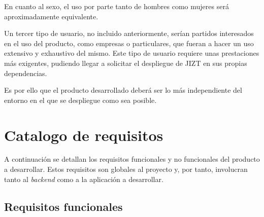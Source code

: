 En cuanto al sexo, el uso por parte tanto de hombres como mujeres será aproximadamente equivalente.

Un tercer tipo de usuario, no incluido anteriormente, serían partidos interesados en el uso del producto, como empresas o particulares, que fueran a hacer un uso extensivo y exhaustivo del mismo. Este tipo de usuario requiere unas prestaciones más exigentes, pudiendo llegar a solicitar el despliegue de JIZT en sus propias dependencias.

Es por ello que el producto desarrollado deberá ser lo más independiente del entorno en el que se despliegue como sea posible.


\section{Catalogo de requisitos}

A continuación se detallan los requisitos funcionales y no funcionales del producto a desarrollar. Estos requisitos son globales al proyecto y, por tanto, involucran tanto al \emph{backend} como a la aplicación a desarrollar.

\subsection{Requisitos funcionales}

